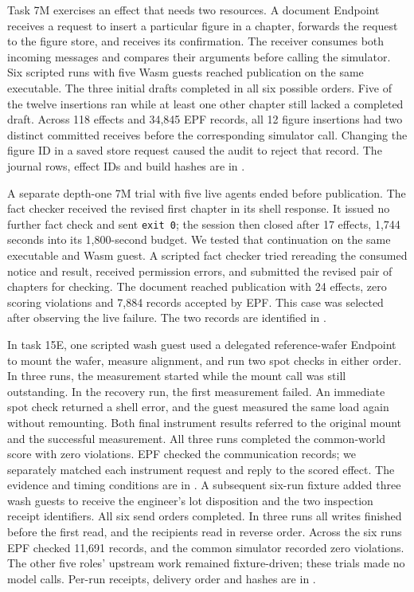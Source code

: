 \documentclass[10pt]{article}
\begin{document}
Task 7M exercises an effect that needs two resources. A document Endpoint
receives a request to insert a particular figure in a chapter, forwards the
request to the figure store, and receives its confirmation. The receiver
consumes both incoming messages and compares their arguments before calling
the simulator. Six scripted runs with five Wasm guests reached publication
on the same executable. The three initial drafts completed in all six possible
orders. Five of the twelve insertions ran while at least one other chapter
still lacked a completed draft. Across 118 effects and 34,845 EPF records,
all 12 figure insertions had two
distinct committed receives before the corresponding simulator call. Changing
the figure ID in a saved store request caused the audit to reject that record.
The journal rows, effect IDs and build hashes are in
.

A separate depth-one 7M trial with five live agents ended before publication.
The fact checker received the revised first chapter in its shell response.
It issued no further fact check and sent \texttt{exit 0}; the session then
closed after 17 effects, 1,744 seconds into its 1,800-second budget.
We tested that continuation on the same executable and Wasm guest. A
scripted fact checker tried rereading the consumed notice and result, received
permission errors, and submitted the revised pair of chapters for checking.
The document reached publication with 24 effects, zero scoring violations
and 7,884 records accepted by EPF. This case was selected after observing the
live failure. The two records are identified in
.

In task 15E, one scripted wash guest used a delegated reference-wafer
Endpoint to mount the wafer, measure alignment, and run two spot checks in
either order. In three runs, the measurement started while the mount call was
still outstanding. In the recovery run, the first measurement failed. An
immediate spot check returned a shell error, and the guest measured the same
load again without remounting. Both final instrument results referred to the
original mount and the successful measurement. All three runs completed the
common-world score with zero violations. EPF checked the communication records;
we separately matched each instrument request and reply to the scored effect.
The evidence and timing conditions are in .
A subsequent six-run fixture added three wash guests to receive the engineer's
lot disposition and the two inspection receipt identifiers. All six send
orders completed. In three runs all writes finished before the first read,
and the recipients read in reverse order. Across the six runs EPF checked
11,691 records, and the common simulator recorded zero violations.
The other five roles' upstream work remained fixture-driven; these trials
made no model calls. Per-run receipts, delivery order and hashes are in
.
\end{document}
